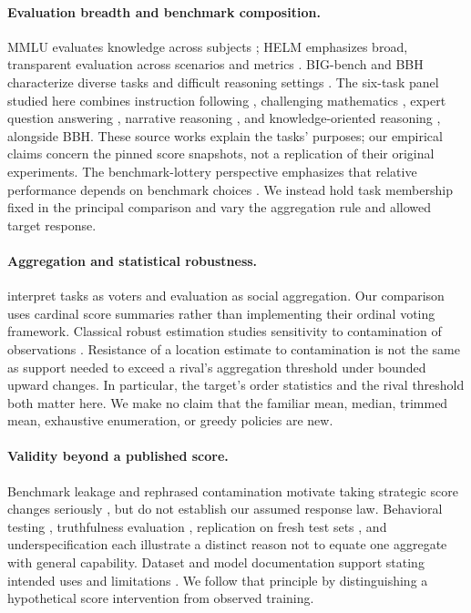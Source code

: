 \documentclass{article}
\begin{document}
\paragraph{Evaluation breadth and benchmark composition.}
MMLU evaluates knowledge across subjects \citep{MMLU}; HELM emphasizes broad, transparent evaluation across scenarios and metrics \citep{HELM}. BIG-bench and BBH characterize diverse tasks and difficult reasoning settings \citep{BIGBench,BBH}. The six-task panel studied here combines instruction following \citep{IFEval}, challenging mathematics \citep{MATH}, expert question answering \citep{GPQA}, narrative reasoning \citep{MuSR}, and knowledge-oriented reasoning \citep{MMLUPro}, alongside BBH. These source works explain the tasks' purposes; our empirical claims concern the pinned score snapshots, not a replication of their original experiments. The benchmark-lottery perspective emphasizes that relative performance depends on benchmark choices \citep{Lottery}. We instead hold task membership fixed in the principal comparison and vary the aggregation rule and allowed target response.

\paragraph{Aggregation and statistical robustness.}
\citet{SocialChoice} interpret tasks as voters and evaluation as social aggregation. Our comparison uses cardinal score summaries rather than implementing their ordinal voting framework. Classical robust estimation studies sensitivity to contamination of observations \citep{Huber}. Resistance of a location estimate to contamination is not the same as support needed to exceed a rival's aggregation threshold under bounded upward changes. In particular, the target's order statistics and the rival threshold both matter here. We make no claim that the familiar mean, median, trimmed mean, exhaustive enumeration, or greedy policies are new.

\paragraph{Validity beyond a published score.}
Benchmark leakage and rephrased contamination motivate taking strategic score changes seriously \citep{Cheater,Rephrased}, but do not establish our assumed response law. Behavioral testing \citep{CheckList}, truthfulness evaluation \citep{TruthfulQA}, replication on fresh test sets \citep{ImageNetReplication}, and underspecification \citep{Underspecification} each illustrate a distinct reason not to equate one aggregate with general capability. Dataset and model documentation support stating intended uses and limitations \citep{Datasheets,ModelCards}. We follow that principle by distinguishing a hypothetical score intervention from observed training.
\end{document}

